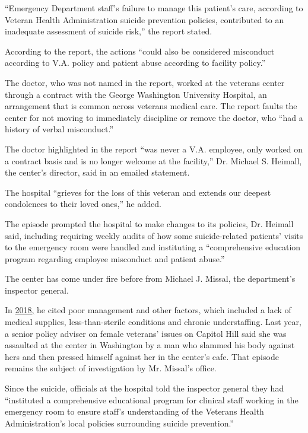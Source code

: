``Emergency Department staff's failure to manage this patient's care,
according to Veteran Health Administration suicide prevention policies,
contributed to an inadequate assessment of suicide risk,'' the report
stated.

According to the report, the actions ``could also be considered
misconduct according to V.A. policy and patient abuse according to
facility policy.''

The doctor, who was not named in the report, worked at the veterans
center through a contract with the George Washington University
Hospital, an arrangement that is common across veterans medical care.
The report faults the center for not moving to immediately discipline or
remove the doctor, who ``had a history of verbal misconduct.''

The doctor highlighted in the report ``was never a V.A. employee, only
worked on a contract basis and is no longer welcome at the facility,''
Dr. Michael S. Heimall, the center's director, said in an emailed
statement.

The hospital ``grieves for the loss of this veteran and extends our
deepest condolences to their loved ones,'' he added.

The episode prompted the hospital to make changes to its policies, Dr.
Heimall said, including requiring weekly audits of how some
suicide-related patients' visits to the emergency room were handled and
instituting a ``comprehensive education program regarding employee
misconduct and patient abuse.''

The center has come under fire before from Michael J. Missal, the
department's inspector general.

In
\href{https://www.stripes.com/news/inspector-general-poor-leadership-led-to-widespread-problems-at-dc-va-1.515388}{2018,}
he cited poor management and other factors, which included a lack of
medical supplies, less-than-sterile conditions and chronic
understaffing. Last year, a senior policy adviser on female veterans'
issues on Capitol Hill said she was assaulted at the center in
Washington by a man who slammed his body against hers and then pressed
himself against her in the center's cafe. That episode remains the
subject of investigation by Mr. Missal's office.

Since the suicide, officials at the hospital told the inspector general
they had ``instituted a comprehensive educational program for clinical
staff working in the emergency room to ensure staff's understanding of
the Veterans Health Administration's local policies surrounding suicide
prevention.''

